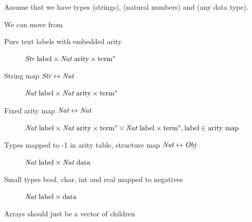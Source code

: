 Assume that we have types \str (strings), \nat (natural numbers) and \obj (any data type). 

We can move from 
\begin{description}
\item [Pure text labels with embedded arity] $\str\ \mbox{label} \times \nat\ \mbox{arity} \times \mbox{term}^*$ 
\item [String map $\mbox{\em Str}\leftrightarrow\mbox{\em Nat}$]  $\nat\ \mbox{label} \times \nat\ \mbox{arity} \times \mbox{term}^*$
\item [Fixed arity map $\mbox{\em Nat}\leftrightarrow\mbox{\em Nat}$] $\nat\ \mbox{label} \times \nat\ \mbox{arity} \times \mbox{term}^* \lor \nat\ \mbox{label} \times \mbox{term}^*, \mbox{label} \in \mbox{arity map}$
\item [Types mapped to -1 in arity table, structure map $\mbox{\em Nat}\leftrightarrow\mbox{\em Obj}$] $\nat\ \mbox{label} \times \nat\ \mbox{data}$
\item [Small types bool, char, int and real mapped to negatives] $\mbox{\em Nat}\ \mbox{label} \times \mbox{data}$
\end{description}

Arrays should just be a vector of children


